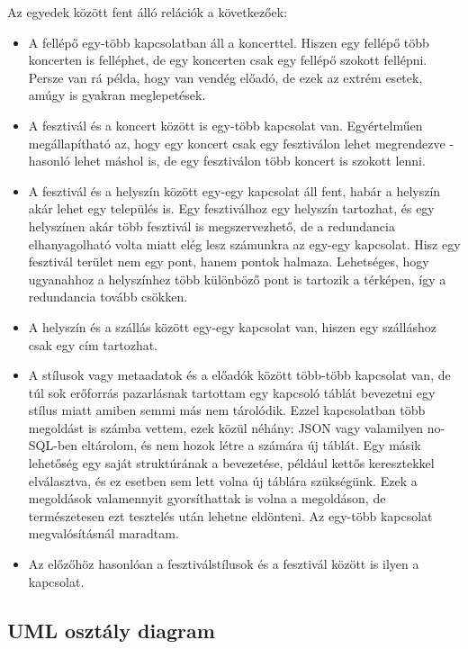 Az egyedek között fent álló relációk a következőek:
\begin{itemize}
\item A fellépő egy-több kapcsolatban áll a koncerttel. Hiszen egy fellépő több koncerten is felléphet, de egy koncerten csak egy fellépő szokott fellépni. Persze van rá példa, hogy van vendég előadó, de ezek az extrém esetek, amúgy is gyakran meglepetések.
\item A fesztivál és a koncert között is egy-több kapcsolat van. Egyértelműen megállapítható az, hogy egy koncert csak egy fesztiválon lehet megrendezve - hasonló lehet máshol is, de egy fesztiválon több koncert is szokott lenni.
\item A fesztivál és a helyszín között egy-egy kapcsolat áll fent, habár a helyszín akár lehet egy település is. Egy fesztiválhoz egy helyszín tartozhat, és egy helyszínen akár több fesztivál is megszervezhető, de a redundancia elhanyagolható volta miatt elég lesz számunkra az egy-egy kapcsolat. Hisz egy fesztivál terület nem egy pont, hanem pontok halmaza. Lehetséges, hogy ugyanahhoz a helyszínhez több különböző pont is tartozik a térképen, így a redundancia tovább csökken.
\item  A helyszín és a szállás között egy-egy kapcsolat van, hiszen egy szálláshoz csak egy cím tartozhat.
\item A stílusok vagy metaadatok és a előadók között több-több kapcsolat van, de túl sok erőforrás pazarlásnak tartottam egy kapcsoló táblát bevezetni egy stílus miatt amiben semmi más nem tárolódik. Ezzel kapcsolatban több megoldást is számba vettem, ezek közül néhány: JSON vagy valamilyen no-SQL-ben eltárolom, és nem hozok létre a számára új táblát. Egy másik lehetőség egy saját struktúrának a bevezetése, például kettős keresztekkel elválasztva, és ez esetben sem lett volna új táblára szükségünk. Ezek a megoldások valamennyit gyorsíthattak is volna a megoldáson, de természetesen ezt tesztelés után lehetne eldönteni. Az egy-több kapcsolat megvalósításnál maradtam.
\item Az előzőhöz hasonlóan a fesztiválstílusok és a fesztivál között is ilyen a kapcsolat.
\end{itemize}

\subsection{UML osztály diagram}

